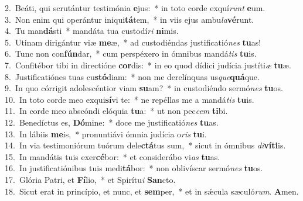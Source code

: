 {2.~}Beáti, qui scrutántur testimónia \textbf{e}jus:~* in toto corde exquí\textit{runt} \textbf{e}um.\\
{3.~}Non enim qui operántur iniqui\textbf{tá}tem,~* in viis ejus ambu\textit{la}\textbf{vé}runt.\\
{4.~}Tu man\textbf{dá}sti~* mandáta tua custodí\textit{ri} \textbf{ni}mis.\\
{5.~}Utinam dirigántur viæ \textbf{me}æ,~* ad custodiéndas justificatió\textit{nes} \textbf{tu}as!\\
{6.~}Tunc non con\textbf{fún}dar,~* cum perspéxero in ómnibus mandá\textit{tis} \textbf{tu}is.\\
{7.~}Confitébor tibi in directióne \textbf{cor}dis:~* in eo quod dídici judícia justíti\textit{æ} \textbf{tu}æ.\\
{8.~}Justificatiónes tuas cu\textbf{stó}diam:~* non me derelínquas us\textit{que}\textbf{quá}que.\\
{9.~}In quo córrigit adolescéntior viam \textbf{su}am?~* in custodiéndo sermó\textit{nes} \textbf{tu}os.\\
{10.~}In toto corde meo exqui\textbf{sí}vi te:~* ne repéllas me a mandá\textit{tis} \textbf{tu}is.\\
{11.~}In corde meo abscóndi elóquia \textbf{tu}a:~* ut non pec\textit{cem} \textbf{ti}bi.\\
{12.~}Benedíctus es, \textbf{Dó}mine:~* doce me justificatió\textit{nes} \textbf{tu}as.\\
{13.~}In lábiis \textbf{me}is,~* pronuntiávi ómnia judícia o\textit{ris} \textbf{tu}i.\\
{14.~}In via testimoniórum tuórum dele\textbf{ctá}tus sum,~* sicut in ómnibus \textit{di}\textbf{ví}\textbf{ti}is.\\
{15.~}In mandátis tuis exer\textbf{cé}bor:~* et considerábo vi\textit{as} \textbf{tu}as.\\
{16.~}In justificatiónibus tuis medi\textbf{tá}bor:~* non oblivíscar sermó\textit{nes} \textbf{tu}os.\\
{17.~}Glória Patri, et \textbf{Fí}lio,~* et Spirítu\textit{i} \textbf{San}cto.\\
{18.~}Sicut erat in princípio, et nunc, et \textbf{sem}per,~* et in sǽcula sæculó\textit{rum}. \textbf{A}men.\\
